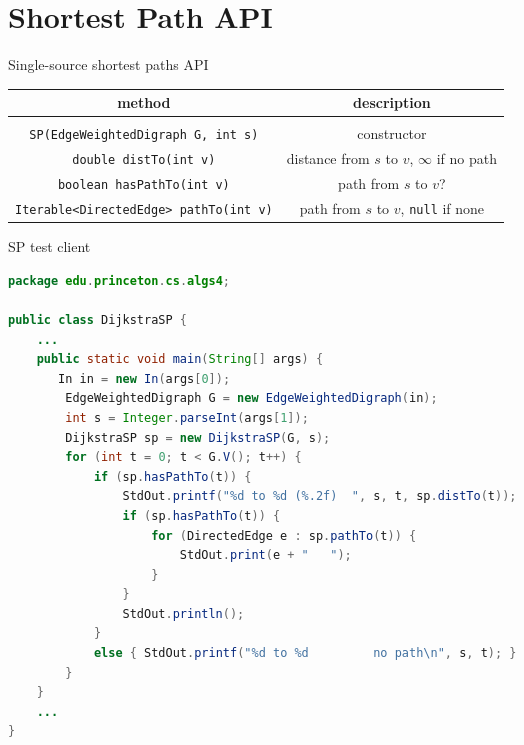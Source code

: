 \documentclass[8pt,a4paper,compress]{beamer}
\begin{document}
\section{Shortest Path API}
\begin{frame}[fragile]
Single-source shortest paths API
\begin{center}
\begin{tabular}{cc}
method & description \\ \hline \\
\lstinline$SP(EdgeWeightedDigraph G, int s)$ & constructor \\
\lstinline$double distTo(int v)$ & distance from $s$ to $v$, $\infty$ if no path \\
\lstinline$boolean hasPathTo(int v)$ & path from $s$ to $v$? \\
\lstinline$Iterable<DirectedEdge> pathTo(int v)$ & path from $s$ to $v$, \lstinline$null$ if none
\end{tabular}  
\end{center}

SP test client
\begin{lstlisting}[language=Java]
package edu.princeton.cs.algs4;

public class DijkstraSP {
    ...
    public static void main(String[] args) {
       In in = new In(args[0]);
        EdgeWeightedDigraph G = new EdgeWeightedDigraph(in);
        int s = Integer.parseInt(args[1]);
        DijkstraSP sp = new DijkstraSP(G, s);
        for (int t = 0; t < G.V(); t++) {
            if (sp.hasPathTo(t)) {
                StdOut.printf("%d to %d (%.2f)  ", s, t, sp.distTo(t));
                if (sp.hasPathTo(t)) {
                    for (DirectedEdge e : sp.pathTo(t)) {
                        StdOut.print(e + "   ");
                    }
                }
                StdOut.println();
            }
            else { StdOut.printf("%d to %d         no path\n", s, t); }
        }
    }
    ...
}
\end{lstlisting}
\end{frame}
\end{document}
